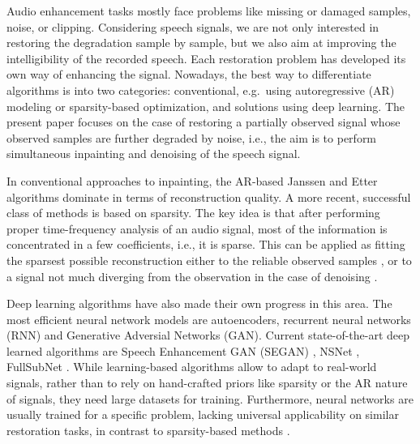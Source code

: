 \documentclass[conference]{IEEEtran}
\begin{document}
Audio enhancement tasks mostly face problems like missing or damaged samples, noise, or clipping.
Considering speech signals, we %
are not only interested in restoring the degradation sample by sample, but we also aim at improving the intelligibility of the recorded speech.
Each restoration problem has developed its own way of enhancing the signal.
Nowadays, the best way to differentiate algorithms is into two categories:
conventional, e.g.\ using autoregressive (AR) modeling or sparsity-based optimization, and solutions using deep learning.
The present paper focuses on the case of restoring a partially observed signal whose observed samples are further degraded by noise, i.e., the aim is to perform simultaneous inpainting and denoising of the speech signal.

In conventional approaches to inpainting, the AR-based Janssen \cite{Janssen1986} and Etter~\cite{Etter1996} algorithms dominate in terms of reconstruction quality.
A more recent, successful class of methods is based on sparsity.
The key idea is that after performing proper time-frequency analysis of an audio signal,
most of the information is concentrated in a few coefficients, i.e., it is sparse.
This can be applied as fitting the sparsest possible reconstruction either to the reliable observed samples \cite{Adler2012, Kitic2015, Zaviska2019, Mokry2019}, or to a signal not much diverging from the observation in the case of denoising \cite{Kowalski2013}.

Deep learning algorithms have also made their own progress in this area.
The most efficient neural network models are autoencoders,
recurrent neural networks (RNN) and
Generative Adversial Networks (GAN).
Current state-of-the-art deep learned algorithms are Speech Enhancement GAN (SEGAN) \cite{Pascual2017}, NSNet \cite{Xia2020}, FullSubNet \cite{Hao2021}.
While learning-based algorithms allow to adapt to real-world signals, rather than to rely on hand-crafted priors like sparsity or the AR nature of signals, they need large datasets for training.
Furthermore, neural networks are usually trained for a specific problem, lacking universal applicability on similar restoration tasks, in contrast to sparsity-based methods \cite{Gaultier2017, Mokry202021, Zaviska2021}.
\end{document}
